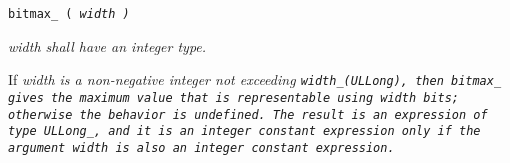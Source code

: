 
\tt{bitmax_ (} \it{width} \tt{)}


\it{width} shall have an integer type.


If \it{width} is a non-negative integer not exceeding \tt{width_(ULLong)},
then \tt{bitmax_} gives the maximum value that is representable
using \it{width} bits; otherwise the behavior is undefined.
The result is an expression of type \tt{ULLong_}, and it is an integer constant
expression only if the argument \it{width} is also an integer constant expression.
